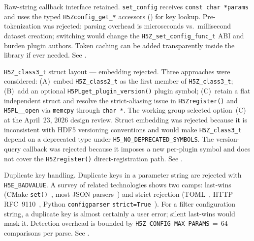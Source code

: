 \documentclass[../RFC-HDFG-2026-001.tex]{subfiles}
\begin{document}
Raw-string callback interface retained.  \texttt{set\_config} receives
\texttt{const char *params} and uses the typed \texttt{H5Zconfig\_get\_*}
accessors () for key lookup.  Pre-tokenization was rejected: parsing overhead is
microseconds vs.\ millisecond dataset creation; switching would change the
\texttt{H5Z\_set\_config\_func\_t} ABI and burden plugin authors.  Token
caching can be added transparently inside the library if ever needed.
See .

\texttt{H5Z\_class3\_t} struct layout --- embedding rejected.
Three approaches were considered: (A)~embed \texttt{H5Z\_class2\_t} as the
first member of \texttt{H5Z\_class3\_t}; (B)~add an optional
\texttt{H5PLget\_plugin\_version()} plugin symbol; (C)~retain a flat
independent struct and resolve the strict-aliasing issue in
\texttt{H5Zregister()} and \texttt{H5PL\_\_open} via \texttt{memcpy}
through \texttt{char~*}.  The working group selected option~(C) at the
April~23, 2026 design review.  Struct embedding was rejected because it is
inconsistent with HDF5 versioning conventions and would make
\texttt{H5Z\_class3\_t} depend on a deprecated type under
\texttt{H5\_NO\_DEPRECATED\_SYMBOLS}.  The version-query callback was
rejected because it imposes a new per-plugin symbol and does not cover the
\texttt{H5Zregister()} direct-registration path.
See .

Duplicate key handling. Duplicate keys in a parameter string are rejected
with \texttt{H5E\_BADVALUE}.  A survey of related technologies shows two
camps: last-wins (CMake \texttt{set()}~\cite{cmakeset}, most JSON
parsers~\cite{rfc8259}) and strict rejection (TOML~\cite{toml10},
HTTP RFC~9110~\cite{rfc9110}, Python \texttt{configparser}
\texttt{strict=True}~\cite{pythonconfigparser}).  For a filter configuration
string, a duplicate key is almost certainly a user error; silent last-wins
would mask it.  Detection overhead is bounded by
\texttt{H5Z\_CONFIG\_MAX\_PARAMS}\,$=\,64$ comparisons per parse.
See .
\end{document}
